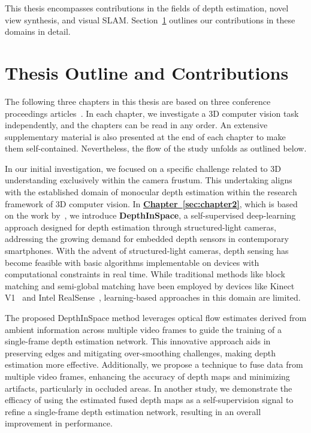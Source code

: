 This thesis encompasses contributions in the fields of depth estimation, novel view synthesis, and visual SLAM. Section~\ref{sec:c1_outline} outlines our contributions in these domains in detail.

\section{Thesis Outline and Contributions} \label{sec:c1_outline}

The following three chapters in this thesis are based on three conference proceedings articles~\citep{johari2021depthinspace,johari2022geonerf, johari2023eslam}. In each chapter, we investigate a 3D computer vision task independently, and the chapters can be read in any order. An extensive supplementary material is also presented at the end of each chapter to make them self-contained. Nevertheless, the flow of the study unfolds as outlined below.

In our initial investigation, we focused on a specific challenge related to 3D understanding exclusively within the camera frustum. This undertaking aligns with the established domain of monocular depth estimation within the research framework of 3D computer vision. In \textbf{\hyperref[sec:chapter2]{Chapter~\ref{sec:chapter2}}}, which is based on the work by~\cite{johari2021depthinspace}, we introduce \textbf{DepthInSpace}, a self-supervised deep-learning approach designed for depth estimation through structured-light cameras, addressing the growing demand for embedded depth sensors in contemporary smartphones. With the advent of structured-light cameras, depth sensing has become feasible with basic algorithms implementable on devices with computational constraints in real time. While traditional methods like block matching and semi-global matching have been employed by devices like Kinect V1~\citep{martinez2013kinect} and Intel RealSense~\citep{keselman2017intel}, learning-based approaches in this domain are limited.

The proposed DepthInSpace method leverages optical flow estimates derived from ambient information across multiple video frames to guide the training of a single-frame depth estimation network. This innovative approach aids in preserving edges and mitigating over-smoothing challenges, making depth estimation more effective. Additionally, we propose a technique to fuse data from multiple video frames, enhancing the accuracy of depth maps and minimizing artifacts, particularly in occluded areas. In another study, we demonstrate the efficacy of using the estimated fused depth maps as a self-supervision signal to refine a single-frame depth estimation network, resulting in an overall improvement in performance.

